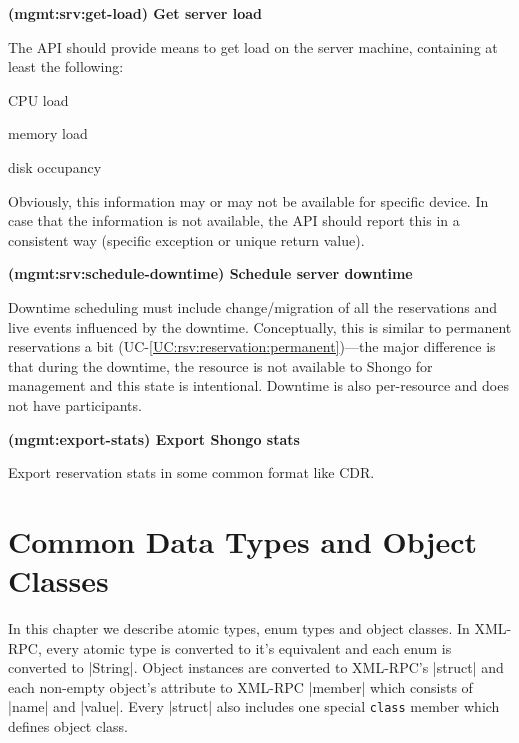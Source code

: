 \documentclass[a4paper]{report}
\makeatletter
\newcommand{\ApiValue}[1]{\verb|#1|}
\newcounter{UCcounter}
\newenvironment{UseCases}%
	{\begin{list}{\textbf{UC-\arabic{UCcounter}}}{\@nmbrlisttrue\def\@listctr{UCcounter}}}%
	{\end{list}}
\newcommand{\UClabel}[1]{\label{UC:#1}}
\newcommand{\UCref}[1]{UC-\ref{UC:#1}}
\newcommand{\UseCase}[2]{\item\UClabel{#2} \textbf{(#2) #1}\\ \nopagebreak}
\makeatother
\begin{document}
\begin{UseCases}

\UseCase{Get server load}{mgmt:srv:get-load}

The API should provide means to get load on the server machine, containing at
least the following:

\begin{compactitem}

\item CPU load

\item memory load

\item disk occupancy

\end{compactitem}

Obviously, this information may or may not be available for specific device.
In case that the information is not available, the API should report this in a
consistent way (specific exception or unique return value).


\UseCase{Schedule server downtime}{mgmt:srv:schedule-downtime}

Downtime scheduling must include change/migration of all the reservations and
live events influenced by the downtime. Conceptually, this is similar to
permanent reservations a bit (\UCref{rsv:reservation:permanent})---the major
difference is that during the downtime, the resource is not available to Shongo
for management and this state is intentional. Downtime is also per-resource and
does not have participants.

\UseCase{Export Shongo stats}{mgmt:export-stats}

Export reservation stats in some common format like CDR.

\end{UseCases}




\chapter{Common Data Types and Object Classes}

In this chapter we describe atomic types, enum types and object classes. In XML-RPC, every atomic type is converted to it's equivalent and each enum is converted to |String|. Object instances are converted to XML-RPC's |struct| and each non-empty object's attribute to XML-RPC |member| which consists of |name| and |value|. Every |struct| also includes one special \ApiValue{class} member which defines object class.
\end{document}
